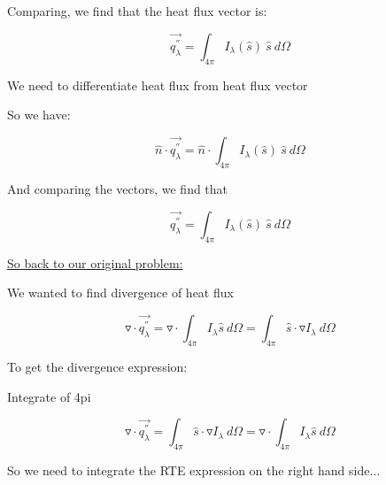 \documentclass[12pt]{article}
\renewcommand{\_}{\kern-1.5pt\textunderscore\kern-1.5pt}
\begin{document}
Comparing, we find that the heat flux vector is:\par

 \[ \overrightarrow{q_{ \lambda }^{''}}= \int _{4 \pi }^{}I_{ \lambda } \left( \hat{s} \right) ~\hat{s}~d \Omega  \] \par


\vspace{\baselineskip}
We need to differentiate heat flux from heat flux vector\par

\par

So we have:\par

 \[ \hat{n} \cdot \overrightarrow{q_{ \lambda }^{''}}=\hat{n} \cdot  \int _{4 \pi }^{}I_{ \lambda } \left( \hat{s} \right) ~\hat{s}~d \Omega  \] \par

And comparing the vectors, we find that\par

 \[ \overrightarrow{q_{ \lambda }^{''}}= \int _{4 \pi }^{}I_{ \lambda } \left( \hat{s} \right) ~\hat{s}~d \Omega  \] \par

\uline{So back to our original problem:}\par

We wanted to find divergence of heat flux\par

 \[ \triangledown  \cdot \overrightarrow{q_{ \lambda }^{''}}=\triangledown  \cdot  \int _{4 \pi }^{}I_{ \lambda }\hat{s}~d \Omega = \int _{4 \pi }^{}\hat{s} \cdot \triangledown I_{ \lambda }~d \Omega  \] \par


\vspace{\baselineskip}
\par

To get the divergence expression:\par

\par

Integrate of 4pi\par

 \[ \triangledown  \cdot \overrightarrow{q_{ \lambda }^{''}}= \int _{4 \pi }^{}\hat{s} \cdot \triangledown I_{ \lambda }~d \Omega =\triangledown  \cdot  \int _{4 \pi }^{}I_{ \lambda }\hat{s}~d \Omega  \] \par

So we need to integrate the RTE expression on the right hand side$ \ldots $ \par
\end{document}
